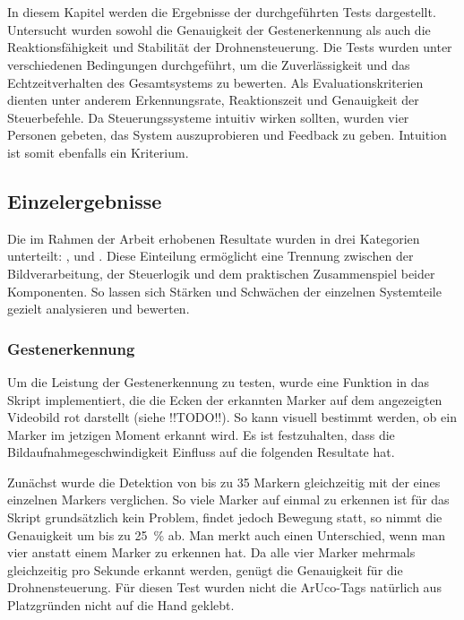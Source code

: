 \chapter{\chapFour}
\label{cha:chapter4} %

\begingroup
\fontsize{12pt}{14pt}\selectfont

In diesem Kapitel werden die Ergebnisse der durchgeführten Tests dargestellt.
Untersucht wurden sowohl die Genauigkeit der Gestenerkennung als auch die Reaktionsfähigkeit und Stabilität der Drohnensteuerung.
Die Tests wurden unter verschiedenen Bedingungen durchgeführt, um die Zuverlässigkeit und das Echtzeitverhalten des Gesamtsystems zu bewerten.
Als Evaluationskriterien dienten unter anderem Erkennungsrate, Reaktionszeit und Genauigkeit der Steuerbefehle.
Da Steuerungssysteme intuitiv wirken sollten, wurden vier Personen gebeten, das System auszuprobieren und Feedback zu geben.
Intuition ist somit ebenfalls ein Kriterium.

\section{Einzelergebnisse}

Die im Rahmen der Arbeit erhobenen Resultate wurden in drei Kategorien unterteilt: ,  und .
Diese Einteilung ermöglicht eine Trennung zwischen der Bildverarbeitung, der Steuerlogik und dem praktischen Zusammenspiel beider Komponenten.
So lassen sich Stärken und Schwächen der einzelnen Systemteile gezielt analysieren und bewerten.

\subsection{Gestenerkennung}
\label{sub:geRec}

Um die Leistung der Gestenerkennung zu testen, wurde eine Funktion in das Skript implementiert, die die Ecken der erkannten Marker auf dem angezeigten Videobild rot darstellt (siehe !!TODO!!).
So kann visuell bestimmt werden, ob ein Marker im jetzigen Moment erkannt wird.
Es ist festzuhalten, dass die Bildaufnahmegeschwindigkeit Einfluss auf die folgenden Resultate hat.\footnotemark{}

Zunächst wurde die Detektion von bis zu 35 Markern gleichzeitig mit der eines einzelnen Markers verglichen.
So viele Marker auf einmal zu erkennen ist für das Skript grundsätzlich kein Problem, findet jedoch Bewegung statt, so nimmt die Genauigkeit um bis zu \SI{25}{\percent} ab.
Man merkt auch einen Unterschied, wenn man vier anstatt einem Marker zu erkennen hat.
Da alle vier Marker mehrmals gleichzeitig pro Sekunde erkannt werden, genügt die Genauigkeit für die Drohnensteuerung.
Für diesen Test wurden nicht die ArUco-Tags natürlich aus Platzgründen nicht auf die Hand geklebt.

